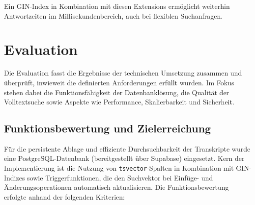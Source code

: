 Ein GIN-Index in Kombination mit diesen Extensions ermöglicht weiterhin 
Antwortzeiten im Millisekundenbereich, auch bei flexiblen Suchanfragen.


\section{Evaluation}

Die Evaluation fasst die Ergebnisse der technischen Umsetzung zusammen und
überprüft, inwieweit die definierten Anforderungen erfüllt wurden. Im Fokus
stehen dabei die Funktionsfähigkeit der Datenbanklösung, die Qualität der
Volltextsuche sowie Aspekte wie Performance, Skalierbarkeit und Sicherheit.

\subsection{Funktionsbewertung und Zielerreichung}
\label{sec:funktionsbewertung}
Für die persistente Ablage und effiziente Durchsuchbarkeit der Transkripte
wurde eine PostgreSQL-Datenbank (bereitgestellt über Supabase) eingesetzt.
Kern der Implementierung ist die Nutzung von \texttt{tsvector}-Spalten in
Kombination mit GIN-Indizes sowie Triggerfunktionen, die den Suchvektor bei
Einfüge- und Änderungsoperationen automatisch aktualisieren. Die
Funktionsbewertung erfolgte anhand der folgenden Kriterien:

